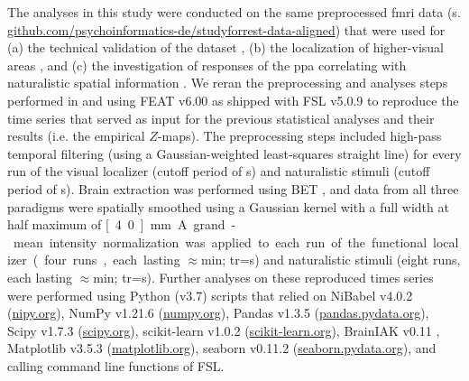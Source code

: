 The analyses in this study were conducted on the same preprocessed \ac{fmri}
data (s.
\href{https://github.com/psychoinformatics-de/studyforrest-data-aligned
}{\url{github.com/psychoinformatics-de/studyforrest-data-aligned}}) that were
used for
%
(a) the technical validation of the dataset \citep{hanke2016simultaneous},
%
(b) the localization of higher-visual areas \citep{sengupta2016extension}, and
%
(c) the investigation of responses of the \ac{ppa} correlating with naturalistic
spatial information \citep{haeusler2022processing}.
%
We reran the preprocessing and analyses steps performed in
\citet{sengupta2016extension} and \citet{haeusler2022processing} using FEAT
v6.00 \citep[FMRI Expert Analysis Tool;][]{woolrich2001autocorr} as shipped with
FSL v5.0.9 \citep[\href{https://www.fmrib.ox.ac.uk/fsl}{FMRIB's Software
Library;}][]{smith2004fsl} to reproduce the time series that served as input for
the previous statistical analyses and their results (i.e. the empirical
$Z$-maps).
The preprocessing steps included high-pass temporal filtering (using a
Gaussian-weighted least-squares straight line) for every run of the visual
localizer (cutoff period of \unit[100]{s}) and naturalistic stimuli (cutoff
period of \unit[150]{s}).
Brain extraction was performed using BET \citep{smith2002bet}, and data from all
three paradigms were spatially smoothed using a Gaussian kernel with a full
width at half maximum of \unit[4.0]{mm}.
A grand-mean intensity normalization was applied to each run of the functional
localizer (four runs, each lasting $\approx$\unit[5]{min}; \ac{tr}=\unit[2]{s})
and naturalistic stimuli (eight runs, each lasting $\approx$\unit[15]{min};
\ac{tr}=\unit[2]{s}).
%
Further analyses on these reproduced times series were performed using Python
(v3.7) scripts that relied on
%
NiBabel v4.0.2 (\href{https://nipy.org}{\url{nipy.org}}),
%
NumPy v1.21.6 (\href{https://numpy.org}{\url{numpy.org}}),
%
Pandas v1.3.5 (\href{https://pandas.pydata.org}{\url{pandas.pydata.org}}),
%
Scipy v1.7.3 (\href{https://scipy.org}{\url{scipy.org}}),
%
scikit-learn v1.0.2 (\href{https://scikit-learn.org}{\url{scikit-learn.org}}),
%
BrainIAK v0.11
\citep[\href{https://brainiak.org}{\url{brainiak.org}}][]{kumar2020brainiak,
kumar2020brainiaktutorial},
%
Matplotlib v3.5.3 (\href{https://matplotlib.org}{\url{matplotlib.org}}),
%
seaborn v0.11.2 (\href{https://seaborn.pydata.org}{\url{seaborn.pydata.org}}),
%
and calling command line functions of FSL.

